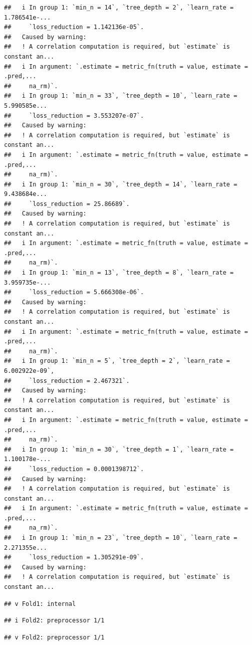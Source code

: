 \documentclass[
]{article}
\begin{document}
\begin{verbatim}
##   i In group 1: `min_n = 14`, `tree_depth = 2`, `learn_rate = 1.786541e-...
##     `loss_reduction = 1.142136e-05`.
##   Caused by warning:
##   ! A correlation computation is required, but `estimate` is constant an...
##   i In argument: `.estimate = metric_fn(truth = value, estimate = .pred,...
##     na_rm)`.
##   i In group 1: `min_n = 33`, `tree_depth = 10`, `learn_rate = 5.990585e...
##     `loss_reduction = 3.553207e-07`.
##   Caused by warning:
##   ! A correlation computation is required, but `estimate` is constant an...
##   i In argument: `.estimate = metric_fn(truth = value, estimate = .pred,...
##     na_rm)`.
##   i In group 1: `min_n = 30`, `tree_depth = 14`, `learn_rate = 9.438684e...
##     `loss_reduction = 25.86689`.
##   Caused by warning:
##   ! A correlation computation is required, but `estimate` is constant an...
##   i In argument: `.estimate = metric_fn(truth = value, estimate = .pred,...
##     na_rm)`.
##   i In group 1: `min_n = 13`, `tree_depth = 8`, `learn_rate = 3.959735e-...
##     `loss_reduction = 5.666308e-06`.
##   Caused by warning:
##   ! A correlation computation is required, but `estimate` is constant an...
##   i In argument: `.estimate = metric_fn(truth = value, estimate = .pred,...
##     na_rm)`.
##   i In group 1: `min_n = 5`, `tree_depth = 2`, `learn_rate = 6.002922e-09`,
##     `loss_reduction = 2.467321`.
##   Caused by warning:
##   ! A correlation computation is required, but `estimate` is constant an...
##   i In argument: `.estimate = metric_fn(truth = value, estimate = .pred,...
##     na_rm)`.
##   i In group 1: `min_n = 30`, `tree_depth = 1`, `learn_rate = 1.100178e-...
##     `loss_reduction = 0.0001398712`.
##   Caused by warning:
##   ! A correlation computation is required, but `estimate` is constant an...
##   i In argument: `.estimate = metric_fn(truth = value, estimate = .pred,...
##     na_rm)`.
##   i In group 1: `min_n = 23`, `tree_depth = 10`, `learn_rate = 2.271355e...
##     `loss_reduction = 1.305291e-09`.
##   Caused by warning:
##   ! A correlation computation is required, but `estimate` is constant an...
\end{verbatim}

\begin{verbatim}
## v Fold1: internal
\end{verbatim}

\begin{verbatim}
## i Fold2: preprocessor 1/1
\end{verbatim}

\begin{verbatim}
## v Fold2: preprocessor 1/1
\end{verbatim}
\end{document}
